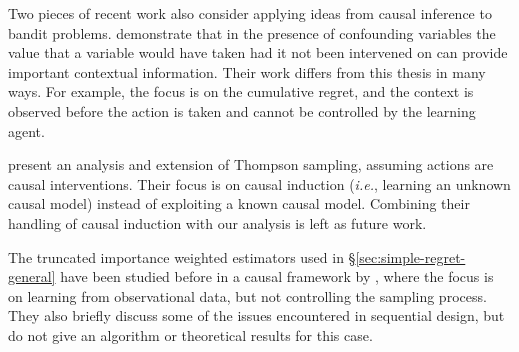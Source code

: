 \documentclass[11pt,a4paper,twoside]{report}
\newcommand{\ie}{\textit{i.e.}}
\newcommand{\bigtheta}[1]{\Theta\left( #1 \right)}
\newcommand{\bigthetatilde}[1]{\tilde{\Theta}\left( #1 \right)}
\newcommand{\bigomega}[1]{\Omega\left( #1 \right)}
\theoremstyle{plain}
\theoremstyle{definition}
\begin{document}

Two pieces of recent work also consider applying ideas from causal inference to bandit problems.\citet{Bareinboim2015} demonstrate that in the presence of confounding variables the value that a variable would have taken had it not been 
intervened on can provide important contextual information. Their work differs from this thesis in many ways. For example, the focus is on the cumulative regret, and the context is observed before the action is taken and cannot be controlled by the learning agent.  


\citet{Ortega2014thompson} present an analysis and extension of Thompson sampling, assuming actions are causal interventions. Their focus is on causal induction (\ie, learning an unknown causal model) instead of exploiting a known causal model. Combining their handling of  causal induction with our analysis is left as future work.

The truncated importance weighted estimators used in \S\ref{sec:simple-regret-general} have been studied before in a causal framework by \citet{Bottou2013}, 
where the focus is on learning from observational data, but not controlling the sampling process. They also briefly discuss some of the issues 
encountered in sequential design, but do not give an algorithm or theoretical results for this case.
\end{document}
